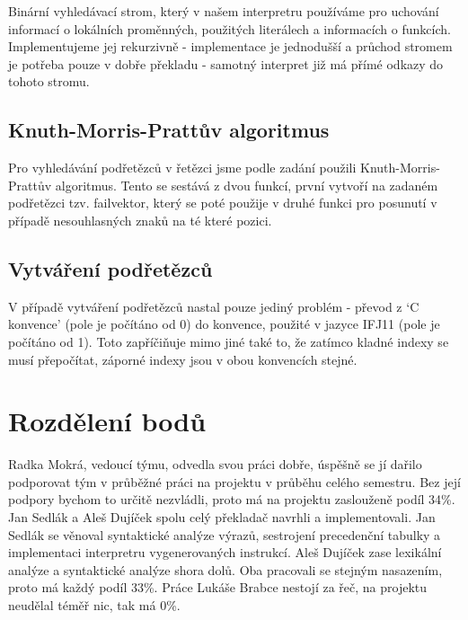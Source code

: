 \documentclass[a4paper,11pt,titlepage]{article}
\begin{document}
Binární vyhledávací strom, který v našem interpretru používáme pro u\-cho\-vá\-ní informací o lokálních proměnných, použitých literálech a informacích o funk\-cích. Implementujeme jej rekurzivně - implementace je jednodušší a průchod stromem je potřeba pouze v dobře překladu - samotný interpret již má přímé odkazy do tohoto stromu.

\subsection{Knuth-Morris-Prattův algoritmus}

Pro vyhledávání podřetězců v řetězci jsme podle zadání použili Knuth-Morris-Prattův algoritmus. Tento se sestává z dvou funkcí, první vytvoří na zadaném podřetězci tzv. failvektor, který se poté použije v druhé funkci pro posunutí v případě nesouhlasných znaků na té které pozici.

\subsection{Vytváření podřetězců}

V případě vytváření podřetězců nastal pouze jediný problém - převod z `C konvence' (pole je počítáno od 0) do konvence, použité v jazyce IFJ11 (pole je počítáno od 1). Toto zapříčiňuje mimo jiné také to, že zatímco kladné indexy se musí přepočítat, záporné indexy jsou v obou konvencích stejné.

\section{Rozdělení bodů}

Radka Mokrá, vedoucí týmu, odvedla svou práci dobře, úspěšně se jí dařilo podporovat tým v průběžné práci na projektu v průběhu celého semestru. Bez její podpory bychom to určitě nezvládli, proto má na projektu zaslouženě podíl 34\%. Jan Sedlák a Aleš Dujíček spolu celý překladač navrhli a implementovali. Jan Sedlák se věnoval syntaktické analýze výrazů, sestrojení precedenční tabulky a implementaci interpretru vygenerovaných instrukcí. Aleš Dujíček zase lexikální analýze a syntaktické analýze shora dolů. Oba pracovali se stejným nasazením, proto má každý podíl 33\%. Práce Lukáše Brabce nestojí za řeč, na projektu neudělal téměř nic, tak má 0\%.
\end{document}
